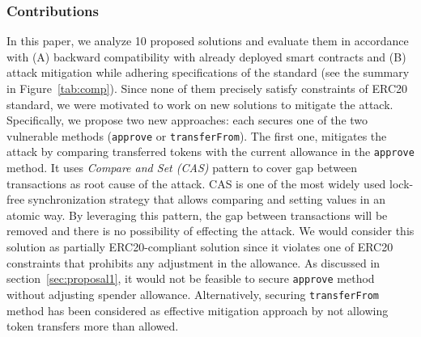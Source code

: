 \subsubsection*{Contributions} In this paper, we analyze 10 proposed solutions and evaluate them in accordance with (A) backward compatibility with already deployed smart contracts and (B) attack mitigation while adhering specifications of the standard (see the summary in Figure~\ref{tab:comp}). Since none of them precisely satisfy constraints of ERC20 standard, we were motivated to work on new solutions to mitigate the attack. Specifically, we propose two new approaches: each secures one of the two vulnerable methods (\ie \texttt{approve} or \texttt{transferFrom}). The first one, mitigates the attack by comparing transferred tokens with the current allowance in the \texttt{approve} method. It uses \textit{Compare and Set (CAS)} pattern\cite{Ref06} to cover gap between transactions as root cause of the attack. CAS is one of the most widely used lock-free synchronization strategy that allows comparing and setting values in an atomic way. By leveraging this pattern, the gap between transactions will be removed and there is no possibility of effecting the attack. We would consider this solution as partially ERC20-compliant solution since it violates one of ERC20 constraints that prohibits any adjustment in the allowance. As discussed in section~\ref{sec:proposal1}, it would not be feasible to secure \texttt{approve} method without adjusting spender allowance. Alternatively, securing \texttt{transferFrom} method has been considered as effective mitigation approach by not allowing token transfers more than allowed.

